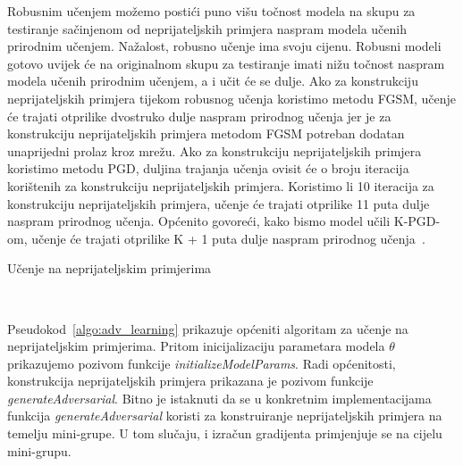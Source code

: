 \documentclass[times, utf8, zavrsni, numeric]{fer}
\newcommand{\pluseq}{\mathrel{+}=}
\begin{document}
\pagebreak

Robusnim učenjem možemo postići puno višu točnost modela na skupu za testiranje sačinjenom od neprijateljskih primjera naspram modela učenih prirodnim učenjem.
Nažalost, robusno učenje ima svoju cijenu. Robusni modeli gotovo uvijek će na originalnom skupu za testiranje imati nižu točnost naspram modela učenih prirodnim učenjem,
a i učit će se dulje. Ako za konstrukciju neprijateljskih primjera tijekom robusnog učenja koristimo metodu FGSM, učenje će trajati otprilike dvostruko dulje naspram prirodnog učenja
jer je za konstrukciju neprijateljskih primjera metodom FGSM potreban dodatan unaprijedni prolaz kroz mrežu. 
Ako za konstrukciju neprijateljskih primjera koristimo metodu PGD, duljina trajanja učenja ovisit će o broju iteracija korištenih za konstrukciju neprijateljskih primjera.
Koristimo li 10 iteracija za konstrukciju neprijateljskih primjera, učenje će trajati otprilike 11 puta dulje naspram prirodnog učenja. 
Općenito govoreći, kako bismo model učili K-PGD-om, učenje će trajati otprilike K + 1 puta dulje naspram prirodnog učenja~\cite{shafahi2019adversarial}.

\begin{algorithm}
    \caption{Učenje na neprijateljskim primjerima}
    \label{algo:adv_learning}
    \begin{algorithmic}
        \\\hrulefill
                \STATE{$grad \pluseq \nabla_{\theta}L(x_{adv},y_{i};\theta)$}
            \ENDFOR
        \ENDFOR
    \end{algorithmic}
\end{algorithm}

Pseudokod~\ref{algo:adv_learning} prikazuje općeniti algoritam za učenje na neprijateljskim primjerima.
Pritom inicijalizaciju parametara modela $\theta$ prikazujemo pozivom funkcije \textit{initializeModelParams}.
Radi općenitosti, konstrukcija neprijateljskih primjera prikazana je pozivom funkcije \textit{generateAdversarial}.
Bitno je istaknuti da se u konkretnim implementacijama funkcija \textit{generateAdversarial} koristi za konstruiranje neprijateljskih primjera na temelju mini-grupe.
U tom slučaju, i izračun gradijenta primjenjuje se na cijelu mini-grupu.
\end{document}
